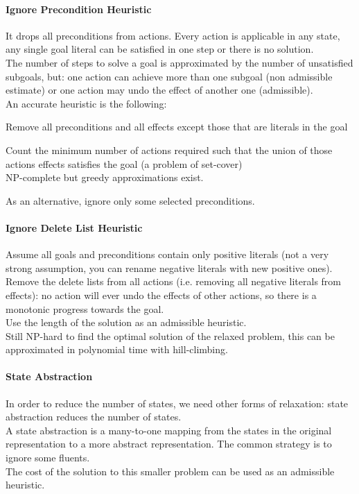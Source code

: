 \documentclass[10pt]{report}
\begin{document}
\paragraph{Ignore Precondition Heuristic} It drops all preconditions from actions. Every action is applicable in any state, any single goal literal can be satisfied in one step or there is no solution.\\
The number of steps to solve a goal is approximated by the number of unsatisfied subgoals, but: one action can achieve more than one subgoal (non admissible estimate) or one action may undo the effect of another one (admissible).\\
An accurate heuristic is the following:
\begin{list}{}{}
	\item Remove all preconditions and all effects except those that are literals in the goal
	\item Count the minimum number of actions required such that the union of those actions effects satisfies the goal (a problem of set-cover)\\
	NP-complete but greedy approximations exist.
\end{list}
As an alternative, ignore only some selected preconditions.
\paragraph{Ignore Delete List Heuristic} Assume all goals and preconditions contain only positive literals (not a very strong assumption, you can rename negative literals with new positive ones).\\
Remove the delete lists from all actions (i.e. removing all negative literals from effects): no action will ever undo the effects of other actions, so there is a monotonic progress towards the goal.\\
Use the length of the solution as an admissible heuristic.\\
Still NP-hard to find the optimal solution of the relaxed problem, this can be approximated in polynomial time with hill-climbing.
\paragraph{State Abstraction} In order to reduce the number of states, we need other forms of relaxation: state abstraction reduces the number of states.\\
A state abstraction is a many-to-one mapping from the states in the original representation to a more abstract representation. The common strategy is to ignore some fluents.\\
The cost of the solution to this smaller problem can be used as an admissible heuristic.
\end{document}
